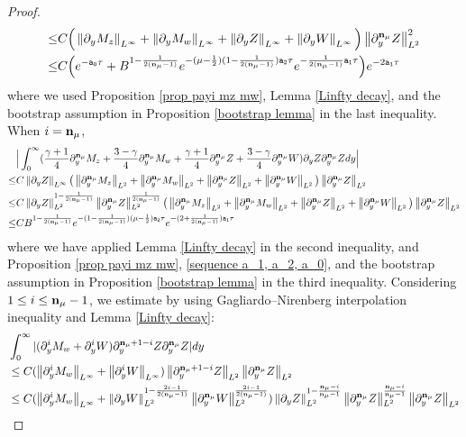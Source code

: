 \documentclass{article}
\newcommand{\norm}[1]{\left\lVert#1\right\rVert}
\newcommand{\ga}{\gamma}
\newcommand{\pa}{\partial}
\def\espz{Z}
\def\espw{W}
\def\mz{M_z}
\def\mw{M_w}
\def\epone{\mathtt{a_1}}
\def\eptwo{\mathtt{a_2}}
\def\epzero{\mathtt{a_0}}
\def\ndmu{{\bf{n}_{\mu}}}
\numberwithin{equation}{section}
\begin{document}
\begin{proof}
\begin{align*}
		 \leq & C\Big(\norm{\pa_y\mz}_{L^\infty}+\norm{\pa_y\mw}_{L^\infty} +\norm{\pa_y\espz}_{L^\infty}+\norm{\pa_y\espw}_{L^\infty}\Big) \norm{\pa_y^\ndmu\espz}_{L^2}^2\\
		 \leq &  C\Big(e^{-\epzero \tau}+B^{1-\frac{1}{2(\ndmu-1)}}e^{-(\mu-\frac12)(1-\frac{1}{2(\ndmu-1)})\eptwo\tau} e^{-\frac{1}{2(\ndmu-1)}\epone \tau}\Big) e^{-2\epone \tau}
	\end{align*}
	where we used Proposition \ref{prop payi mz mw}, Lemma \ref{Linfty decay}, and the bootstrap assumption in Proposition \ref{bootstrap lemma} in the last inequality. When $i=\ndmu$, 
    \begin{align*}
        &\Big|\int_0^\infty (\frac{\ga+1}{4}\pa_y^\ndmu\mz+\frac{3-\ga}{4}\pa_y^\ndmu\mw+\frac{\ga+1}{4}\pa_y^\ndmu\espz+\frac{3-\ga}{4}\pa_y^\ndmu\espw)\partial_y\espz\pa_y^{\ndmu} \espz dy\Big|\\
        \leq & C \norm{\pa_y \espz}_{L^\infty}\big(\norm{\pa_y^{\ndmu} \mz}_{L^2}+\norm{\pa_y^{\ndmu} \mw}_{L^2}+\norm{\pa_y^{\ndmu} \espz}_{L^2}+\norm{\pa_y^{\ndmu} \espw}_{L^2} \big) \norm{\pa_y^{\ndmu} \espz}_{L^2}\\
        \leq & C \norm{\pa_y \espz}_{L^2}^{1-\frac{1}{2(\ndmu-1)}}\norm{\pa_y^\ndmu \espz}_{L^2}^{\frac{1}{2(\ndmu-1)}}\big(\norm{\pa_y^{\ndmu} \mz}_{L^2}+\norm{\pa_y^{\ndmu} \mw}_{L^2}+\norm{\pa_y^{\ndmu} \espz}_{L^2}+\norm{\pa_y^{\ndmu} \espw}_{L^2} \big) \norm{\pa_y^{\ndmu} \espz}_{L^2}\\
        \leq & CB^{1-\frac{1}{2(\ndmu-1)}} e^{-(1-\frac{1}{2(\ndmu-1)})(\mu-\frac12)\eptwo \tau} e^{-(2+\frac{1}{2(\ndmu-1)})\epone \tau}
    \end{align*}
    where we have applied Lemma \ref{Linfty decay} in the second inequality, and Proposition \ref{prop payi mz mw}, \eqref{sequence a_1, a_2, a_0}, and the bootstrap assumption in Proposition \ref{bootstrap lemma} in the third inequality. 
	Considering $1\leq i\leq \ndmu-1$, we estimate by using Gagliardo–Nirenberg interpolation inequality and Lemma \ref{Linfty decay}:
	\begin{align}
		&\int_0^\infty |(\pa_y^i\mw+\pa_y^i\espw)\partial_y^{\ndmu+1-i}\espz\pa_y^\ndmu \espz | dy\notag \\
        &\leq C (\norm{\pa_y^i\mw}_{L^\infty}+\norm{\pa_y^i\espw}_{L^\infty}) \norm{\partial_y^{\ndmu+1-i}\espz}_{L^2} \norm{\pa_y^\ndmu \espz}_{L^2}\notag\\
		&\leq C (\norm{\pa_y^i\mw}_{L^\infty}+\norm{\pa_y \espw}_{L^2}^{1-\frac{2i-1}{2(\ndmu-1)}} \norm{\pa_y^\ndmu \espw}_{L^2}^{\frac{2i-1}{2(\ndmu-1)}} )\norm{\pa_y \espz}_{L^2}^{1-\frac{\ndmu-i}{\ndmu-1}} \norm{\pa_y^\ndmu \espz}_{L^2}^{\frac{\ndmu-i}{\ndmu-1}} \norm{\pa_y^\ndmu \espz}_{L^2}\notag\\

\end{align}
\end{proof}
\end{document}
